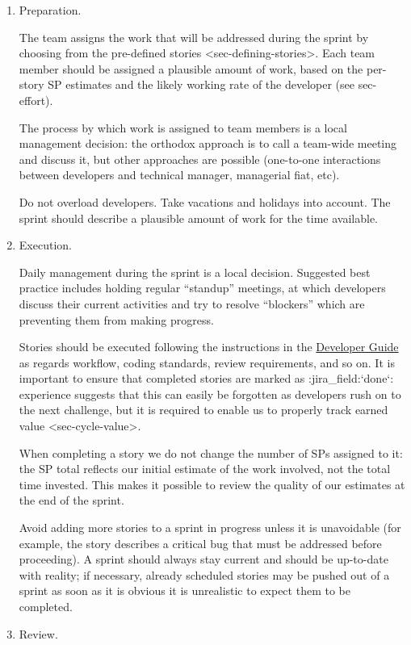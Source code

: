 \begin{enumerate}
\item
  Preparation.

  The team assigns the work that will be addressed during the sprint by
  choosing from the
  pre-defined stories \textless{}sec-defining-stories\textgreater{}.
  Each team member should be assigned a plausible amount of work, based
  on the per-story SP estimates and the likely working rate of the
  developer (see sec-effort).

  The process by which work is assigned to team members is a local
  management decision: the orthodox approach is to call a team-wide
  meeting and discuss it, but other approaches are possible (one-to-one
  interactions between developers and technical manager, managerial
  fiat, etc).

  Do not overload developers. Take vacations and holidays into account.
  The sprint should describe a plausible amount of work for the time
  available.
\item
  Execution.

  Daily management during the sprint is a local decision. Suggested best
  practice includes holding regular ``standup'' meetings, at which
  developers discuss their current activities and try to resolve
  ``blockers'' which are preventing them from making progress.

  Stories should be executed following the instructions in the
  \href{http://developer.lsst.io/}{Developer Guide} as regards workflow,
  coding standards, review requirements, and so on. It is important to
  ensure that completed stories are marked as :jira\_field:`done`:
  experience suggests that this can easily be forgotten as developers
  rush on to the next challenge, but it is required to enable us to
  properly track earned value \textless{}sec-cycle-value\textgreater{}.

  When completing a story we do not change the number of SPs assigned to
  it: the SP total reflects our initial estimate of the work involved,
  not the total time invested. This makes it possible to review the
  quality of our estimates at the end of the sprint.

  Avoid adding more stories to a sprint in progress unless it is
  unavoidable (for example, the story describes a critical bug that must
  be addressed before proceeding). A sprint should always stay current
  and should be up-to-date with reality; if necessary, already scheduled
  stories may be pushed out of a sprint as soon as it is obvious it is
  unrealistic to expect them to be completed.
\item
  Review.


\end{enumerate}
